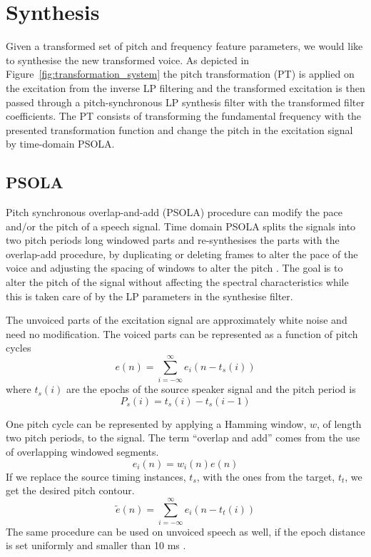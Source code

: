 

\section{Synthesis} %
\label{sec:synthesis}
Given a transformed set of pitch and frequency feature parameters, we would like to synthesise the new transformed voice. As depicted in Figure~\ref{fig:transformation_system} the pitch transformation (PT) is applied on the excitation from the inverse LP filtering and the transformed excitation is then passed through a pitch-synchronous LP synthesis filter with the transformed filter coefficients. The PT consists of transforming the fundamental frequency with the presented transformation function and change the pitch in the excitation signal by time-domain PSOLA.

\subsection{PSOLA} %
\label{sub:psola}
Pitch synchronous overlap-and-add (PSOLA) procedure can modify the pace and/or the pitch of a speech signal. Time domain PSOLA splits the signals into two pitch periods long windowed parts and re-synthesises the parts with the overlap-add procedure, by duplicating or deleting frames to alter the pace of the voice and adjusting the spacing of windows to alter the pitch \cite{taletek}. The goal is to alter the pitch of the signal without affecting the spectral characteristics while this is taken care of by the LP parameters in the synthesise filter. 

The unvoiced parts of the excitation signal are approximately white noise and need no modification. The voiced parts can be represented as a function of pitch cycles
\begin{equation}
	e(n)=\sum_{i=-\infty}^{\infty}e_i(n-t_s(i))
\end{equation}
where $t_s(i)$ are the epochs of the source speaker signal and the pitch period is
\begin{equation}
	P_s(i) = t_s(i)-t_s(i-1)
\end{equation}

One pitch cycle can be represented by applying a Hamming window, $w$, of length two pitch periods, to the signal. The term ``overlap and add'' comes from the use of overlapping windowed segments.
\begin{equation}
	e_i(n)=w_i(n)e(n)
\end{equation}
If we replace the source timing instances, $t_s$, with the ones from the target, $t_t$, we get the desired pitch contour.
\begin{equation}
	\tilde{e}(n)=\sum_{i=-\infty}^{\infty}e_i(n-t_t(i)) %
\end{equation}
The same procedure can be used on unvoiced speech as well, if the epoch distance is set uniformly and smaller than 10 ms \cite{moulines95a}.

